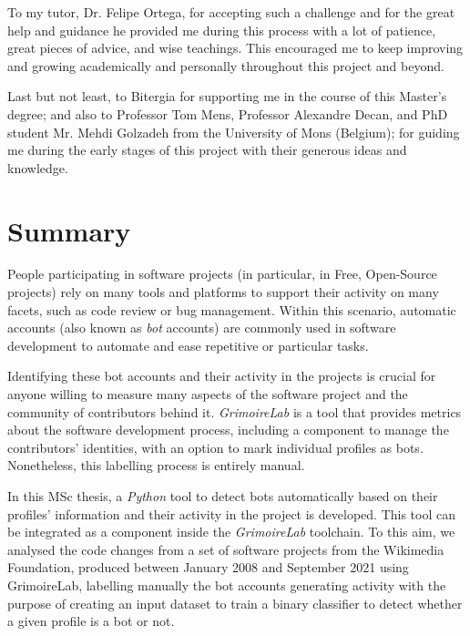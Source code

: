 \documentclass[a4paper, 12pt]{book}
\begin{document}
To my tutor, Dr. Felipe Ortega, for accepting such a challenge and for the great help and guidance he provided me during this process with a lot of patience, great pieces of advice, and wise teachings. This encouraged me to keep improving and growing academically and personally throughout this project and beyond.

Last but not least, to Bitergia for supporting me in the course of this Master's degree; and also to Professor Tom Mens, Professor Alexandre Decan, and PhD student Mr. Mehdi Golzadeh from the University of Mons (Belgium); for guiding me during the early stages of this project with their generous ideas and knowledge.




\chapter*{Summary}

People participating in software projects (in particular, in Free, Open-Source projects) rely on many tools and platforms to support their activity on many facets, such as code review or bug management. Within this scenario, automatic accounts (also known as \emph{bot} accounts) are commonly used in software development to automate and ease repetitive or particular tasks.

Identifying these bot accounts and their activity in the projects is crucial for anyone willing to measure many aspects of the software project and the community of contributors behind it. \emph{GrimoireLab} is a tool that provides metrics about the software development process, including a component to manage the contributors' identities, with an option to mark individual profiles as bots. Nonetheless, this labelling process is entirely manual.

In this MSc thesis, a \emph{Python} tool to detect bots automatically based on their profiles' information and their activity in the project is developed. This tool can be integrated as a component inside the \emph{GrimoireLab} toolchain. To this aim, we analysed the code changes from a set of software projects from the Wikimedia Foundation, produced between January 2008 and September 2021 using GrimoireLab, labelling manually the bot accounts generating activity with the purpose of creating an input dataset to train a binary classifier to detect whether a given profile is a bot or not.
\end{document}

